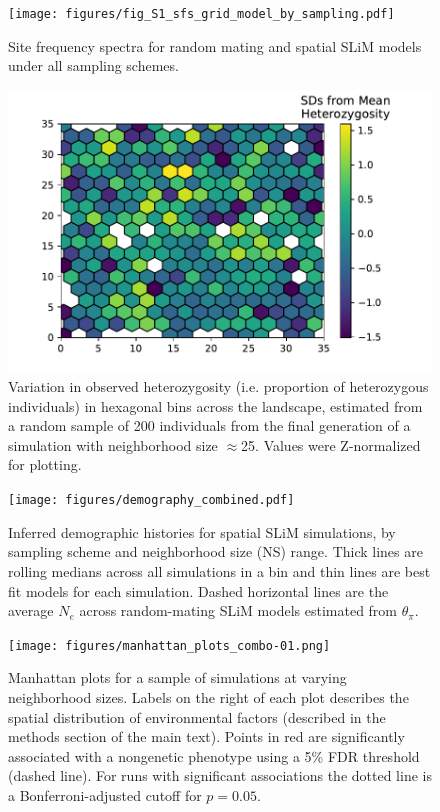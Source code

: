 \documentclass[10pt,twoside,lineno,hidelinks]{preprint}
\begin{document}
\begin{figure}[p]
\centering
\texttt{[image: figures/fig\_S1\_sfs\_grid\_model\_by\_sampling.pdf]}
\caption{Site frequency spectra for random mating and spatial SLiM models under all sampling schemes.}
\label{fig:allsfs}
\end{figure}
\FloatBarrier

\begin{figure}[p]
\centering
\includegraphics[]{figures/het_z_by_ind.pdf}
\caption{Variation in observed heterozygosity (i.e. proportion of heterozygous individuals) in hexagonal bins across the landscape, estimated from a random sample of 200 individuals from the final generation of a simulation with neighborhood size $\approx$25. Values were Z-normalized for plotting.}
\label{fig:hetmap}
\end{figure}
\FloatBarrier

\begin{figure}[p]
\centering
\texttt{[image: figures/demography\_combined.pdf]}
\caption{Inferred demographic histories for spatial SLiM simulations, by sampling scheme and neighborhood size (NS) range. Thick lines are rolling medians across all simulations in a bin and thin lines are best fit models for each simulation. Dashed horizontal lines are the average $N_{e}$ across random-mating SLiM models estimated from $\theta_{\pi}$.}
\label{fig:demography_supplement}
\end{figure}
\FloatBarrier

\begin{figure}[p]
\centering
\texttt{[image: figures/manhattan\_plots\_combo-01.png]}
\caption{Manhattan plots for a sample of simulations at varying neighborhood sizes. Labels on the right of each plot describes the spatial distribution of environmental factors (described in the methods section of the main text). Points in red are significantly associated with a nongenetic phenotype using a 5\% FDR threshold (dashed line). For runs with significant associations the dotted line is a Bonferroni-adjusted cutoff for $p=0.05$.}
\label{fig:manhattan_plots}
\end{figure}
\FloatBarrier
\end{document}

